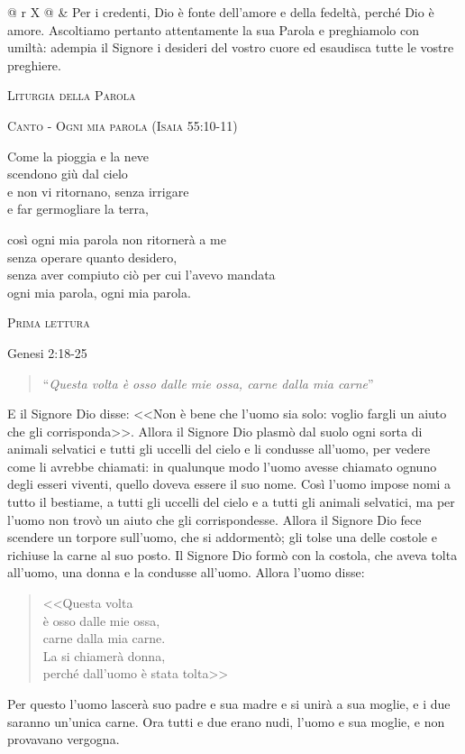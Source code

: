 \documentclass[12pt,twoside]{article}
\makeatletter
\newcommand{\htwo}[1]{{\Large\scshape #1}}
\newcommand{\masspart}[1]{\bigskip

  \htwo{#1}}
\newcommand{\masssubpart}[1]{\bigskip

  {\large\scshape #1}}
\newcommand{\sayline}[2]{
  \begin{tabularx}{\textwidth}{@{} r X @{}}
    \makebox[6.0em][r]{\ifx&#1& #1 \else \textit{#1:} \fi} & #2
\end{tabularx}}
\newcommand{\reading}[1]{#1}
\newcommand{\readingquote}[1]{
\begin{quote}
``\textit{#1}''
\end{quote}
}
\makeatother
\begin{document}
{\sayline{}{Per i credenti, Dio è fonte dell'amore e della fedeltà, perché Dio è amore. Ascoltiamo pertanto attentamente la sua Parola e preghiamolo con umiltà: adempia il Signore i desideri del vostro cuore ed esaudisca tutte le vostre preghiere.}


\masspart{Liturgia della Parola}

\masssubpart{Canto - Ogni mia parola (Isaia 55:10-11)}

Come la pioggia e la neve\\
scendono giù dal cielo\\
e non vi ritornano, senza irrigare\\
e far germogliare la terra,

così ogni mia parola non ritornerà a me\\
senza operare quanto desidero,\\
senza aver compiuto ciò per cui l'avevo mandata\\
ogni mia parola, ogni mia parola.

\newpage

\masssubpart{Prima lettura}

\reading{Genesi 2:18-25}
\readingquote{Questa volta è osso dalle mie ossa, carne dalla mia carne}

E il Signore Dio disse: <<Non è bene che l'uomo sia solo: voglio fargli un aiuto che gli corrisponda>>. Allora il Signore Dio plasmò dal suolo ogni sorta di animali selvatici e tutti gli uccelli del cielo e li condusse all'uomo, per vedere come li avrebbe chiamati: in qualunque modo l'uomo avesse chiamato ognuno degli esseri viventi, quello doveva essere il suo nome. Così l'uomo impose nomi a tutto il bestiame, a tutti gli uccelli del cielo e a tutti gli animali selvatici, ma per l'uomo non trovò un aiuto che gli corrispondesse. Allora il Signore Dio fece scendere un torpore sull'uomo, che si addormentò; gli tolse una delle costole e richiuse la carne al suo posto. Il Signore Dio formò con la costola, che aveva tolta all'uomo, una donna e la condusse all'uomo. Allora l'uomo disse:
\begin{quote}
<<Questa volta\\
è osso dalle mie ossa,\\
carne dalla mia carne.\\
La si chiamerà donna,\\
perché dall'uomo è stata tolta>>
\end{quote}
Per questo l'uomo lascerà suo padre e sua madre e si unirà a sua moglie, e i due saranno un'unica carne.
Ora tutti e due erano nudi, l'uomo e sua moglie, e non provavano vergogna.

}
\end{document}
